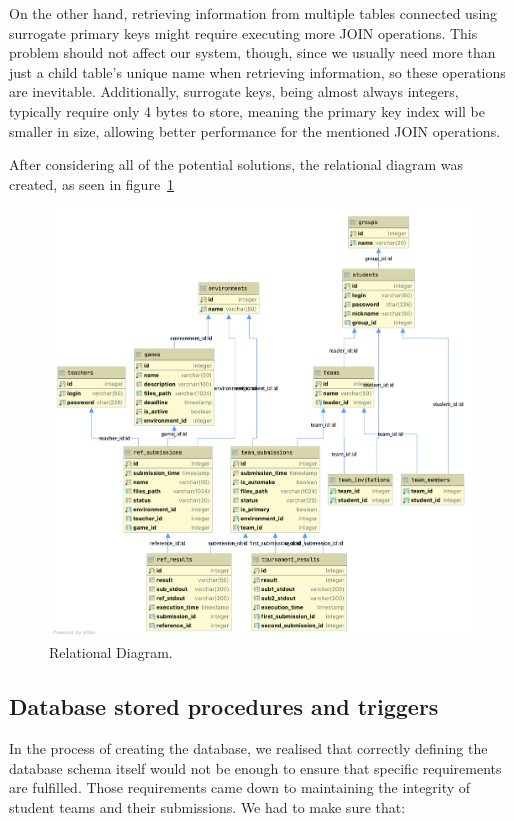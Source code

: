 On the other hand, retrieving information from multiple tables connected using surrogate primary keys might require executing more JOIN operations. This problem should not affect our system, though, since we usually need more than just a child table's unique name when retrieving information, so these operations are inevitable. Additionally, surrogate keys, being almost always integers, typically require only 4 bytes to store, meaning the primary key index will be smaller in size, allowing better performance for the mentioned JOIN operations. 

After considering all of the potential solutions, the relational diagram was created, as seen in figure~\ref{fig:relational_diagram}

\begin{figure}[t]
    \centering\includegraphics[width=\textwidth]{figures/relational_schema.png}
    \caption{Relational Diagram.}\label{fig:relational_diagram}
\end{figure}

\subsection{Database stored procedures and triggers}

In the process of creating the database, we realised that correctly defining the database schema itself would not be enough to ensure that specific requirements are fulfilled. Those requirements came down to maintaining the integrity of student teams and their submissions. We had to make sure that:

